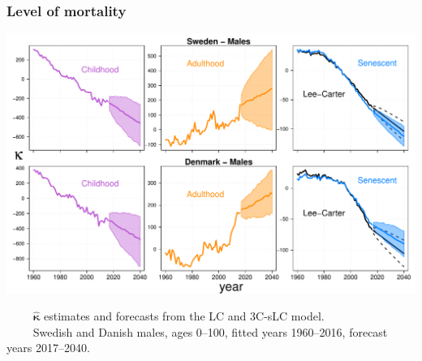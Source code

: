 \documentclass[12pt, xcolor=table]{beamer}  %
\begin{document}
\begin{frame}[noframenumbering]           
	\frametitle{Level of mortality}
	
	\vspace{-0.25cm}
	
	\begin{center}
		\includegraphics[scale=0.41]{Figures/Ch5/KappaFore3_M}
	\end{center}

\vspace{-0.3cm}	
\tiny{$\quad\quad$ $\bm{\hat{\kappa}}$ estimates and forecasts from the LC and 3C-sLC model. \\ $\quad\quad$ Swedish and Danish males, ages 0--100, fitted years 1960--2016, forecast years 2017--2040.}
	
\end{frame}
\end{document}
